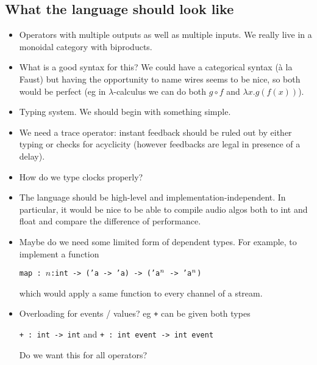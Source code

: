 \documentclass[a4paper,titlepage]{article}
\begin{document}
\subsection{What the language should look like}
\begin{itemize}
\item Operators with multiple outputs as well as multiple inputs. We really live
  in a monoidal category with biproducts.
\item What is a good syntax for this? We could have a categorical syntax (à la
  Faust) but having the opportunity to name wires seems to be nice, so both
  would be perfect (eg in $\lambda$-calculus we can do both $g\circ f$ and
  $\lambda x.g(f(x))$).
\item Typing system. We should begin with something simple.
\item We need a trace operator: instant feedback should be ruled out by either
  typing or checks for acyclicity (however feedbacks are legal in presence of a
  delay).
\item How do we type clocks properly?
\item The language should be high-level and implementation-independent. In
  particular, it would be nice to be able to compile audio algos both to int and
  float and compare the difference of performance.
\item Maybe do we need some limited form of dependent types. For example, to
  implement a function
  \begin{center}
    \texttt{map : $n$:int -> ('a -> 'a) -> ('a$\null^n$ -> 'a$\null^n$)}
  \end{center}
   which would apply a same function to every channel of a stream.
 \item Overloading for events / values? eg \texttt{+} can be given both types
   \begin{center}
     \verb|+ : int -> int|
     \qquad and\qquad
     \verb|+ : int event -> int event|
   \end{center}
   Do we want this for all operators?
\end{itemize}
\end{document}
